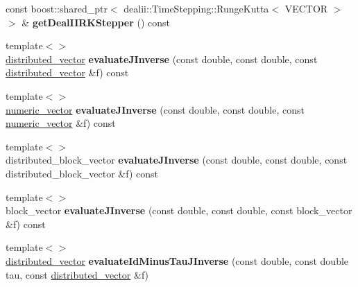 \begin{DoxyCompactItemize}
\item 
\hypertarget{classnatrium_1_1DealIIWrapper_aa3884302049151f381feeafab93b7862}{
const boost::shared\_\-ptr$<$ dealii::TimeStepping::RungeKutta$<$ VECTOR $>$ $>$ \& {\bfseries getDealIIRKStepper} () const }
\label{classnatrium_1_1DealIIWrapper_aa3884302049151f381feeafab93b7862}

\item 
\hypertarget{classnatrium_1_1DealIIWrapper_ad9f669169c770a15fc9edf5e93030b1f}{
{\footnotesize template$<$$>$ }\\\hyperlink{namespacenatrium_a903d2b92917f582f2ff05f52160ab811}{distributed\_\-vector} {\bfseries evaluateJInverse} (const double, const double, const \hyperlink{namespacenatrium_a903d2b92917f582f2ff05f52160ab811}{distributed\_\-vector} \&f) const}
\label{classnatrium_1_1DealIIWrapper_ad9f669169c770a15fc9edf5e93030b1f}

\item 
\hypertarget{classnatrium_1_1DealIIWrapper_a83a7d57a68f35158263bf74c0a4d5aed}{
{\footnotesize template$<$$>$ }\\\hyperlink{namespacenatrium_a67c39077adc6634f8fa3762b8eef24c4}{numeric\_\-vector} {\bfseries evaluateJInverse} (const double, const double, const \hyperlink{namespacenatrium_a67c39077adc6634f8fa3762b8eef24c4}{numeric\_\-vector} \&f) const}
\label{classnatrium_1_1DealIIWrapper_a83a7d57a68f35158263bf74c0a4d5aed}

\item 
\hypertarget{classnatrium_1_1DealIIWrapper_a43b19df161e01db3b99489877eaf6451}{
{\footnotesize template$<$$>$ }\\distributed\_\-block\_\-vector {\bfseries evaluateJInverse} (const double, const double, const distributed\_\-block\_\-vector \&f) const}
\label{classnatrium_1_1DealIIWrapper_a43b19df161e01db3b99489877eaf6451}

\item 
\hypertarget{classnatrium_1_1DealIIWrapper_a389c33cc682c761e63adb08fd4f68031}{
{\footnotesize template$<$$>$ }\\block\_\-vector {\bfseries evaluateJInverse} (const double, const double, const block\_\-vector \&f) const}
\label{classnatrium_1_1DealIIWrapper_a389c33cc682c761e63adb08fd4f68031}

\item 
\hypertarget{classnatrium_1_1DealIIWrapper_ab0e57073c150e04e063dc621bf9b94f5}{
{\footnotesize template$<$$>$ }\\\hyperlink{namespacenatrium_a903d2b92917f582f2ff05f52160ab811}{distributed\_\-vector} {\bfseries evaluateIdMinusTauJInverse} (const double, const double tau, const \hyperlink{namespacenatrium_a903d2b92917f582f2ff05f52160ab811}{distributed\_\-vector} \&f)}
\label{classnatrium_1_1DealIIWrapper_ab0e57073c150e04e063dc621bf9b94f5}


\end{DoxyCompactItemize}
